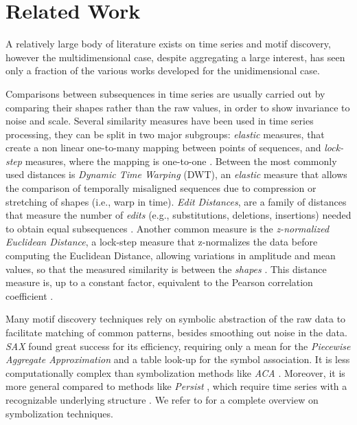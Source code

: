 \section{Related Work}
\label{sec:relwork}
A relatively large body of literature exists on time series and motif discovery, however the multidimensional case, despite aggregating a large interest, has seen only a fraction of the various works developed for the unidimensional case.

Comparisons between subsequences in time series are usually carried out by comparing their shapes rather than the raw values, in order to show invariance to noise and scale.
Several similarity measures have been used in time series processing, they can be split in two major subgroups: \textit{elastic} measures, that create a non linear one-to-many mapping between points of sequences, and \textit{lock-step} measures, where the mapping is one-to-one \cite{distances}. Between the most commonly used distances is \textit{Dynamic Time Warping} (DWT), an \textit{elastic} measure that allows the comparison of temporally misaligned sequences due to compression or stretching of shapes (i.e., warp in time).
\textit{Edit Distances}, are a family of distances that measure the number of \textit{edits} (e.g., substitutions, deletions, insertions) needed to obtain equal subsequences \cite{xiao2019edit}. Another common measure is the \textit{z-normalized Euclidean Distance}, a lock-step measure that z-normalizes the data before computing the Euclidean Distance, allowing variations in amplitude and mean values, so that the measured similarity is between the \textit{shapes} \cite{de2019implications}. 
This distance measure is, up to a constant factor, equivalent to the Pearson correlation coefficient \cite{berthold2016pearseucl}.

Many motif discovery techniques rely on symbolic abstraction of the raw data to facilitate matching of common patterns, besides smoothing out noise in the data. \textit{SAX} \cite{sax} found great success for its efficiency, requiring only a mean for the \textit{Piecewise Aggregate Approximation} and a table look-up for the symbol association.
It is less computationally complex than symbolization methods like \textit{ACA} \cite{sant2011symbolization}. Moreover, it is more general compared to methods like \textit{Persist} \cite{persist2005}, which require time series with a recognizable underlying structure \cite{sant2011symbolization}. We refer to \cite{symbolizationreview} for a complete overview on symbolization techniques.

